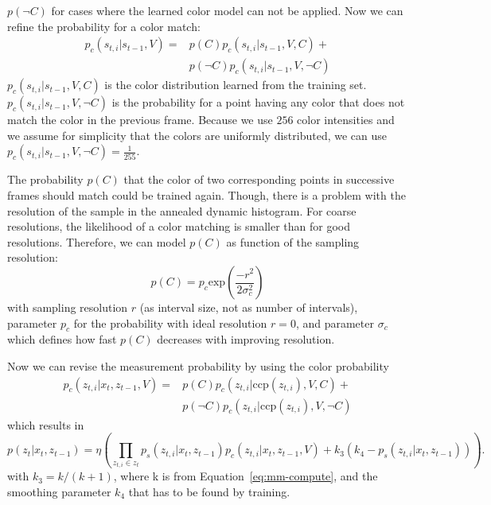 \documentclass[twoside,a4paper,article]{combine}
\begin{document}
$p(\neg C)$ for cases where the learned color model can not be
applied. Now we can refine the probability for a color match:
\begin{align}
p_c(s_{t,i}|s_{t-1},V)
  = &p(C)p_c(s_{t,i}|s_{t-1},V,C)+ \nonumber\\
&p(\neg C)p_c(s_{t,i}|s_{t-1},V,\neg C)\nonumber
\end{align}
$p_c(s_{t,i}|s_{t-1},V,C)$ is the color distribution learned from the
training set. $p_c(s_{t,i}|s_{t-1},V,\neg C)$ is the probability for a
point having any color that does not match the color in the previous
frame. Because we use $256$ color intensities and we assume for
simplicity that the colors are uniformly distributed, we can use
$p_c(s_{t,i}|s_{t-1},V,\neg C) = \frac{1}{255}$.

The probability $p(C)$ that the color of two corresponding points in
successive frames should match could be trained again. Though, there is
a problem with the resolution of the sample in the annealed dynamic
histogram. For coarse resolutions, the likelihood of a color
matching is smaller than for good resolutions. Therefore, we can model
$p(C)$ as function of the sampling resolution:
\begin{equation}
  p(C) = p_c \mathrm{exp}\left( \frac{-r^2}{2\sigma_c^2} \right)
\end{equation}
with sampling resolution $r$ (as interval size, not as number of
intervals), parameter $p_c$ for the probability with ideal resolution
$r=0$, and parameter $\sigma_c$ which defines how fast $p(C)$ decreases
with improving resolution.

Now we can revise the measurement probability by
using the color probability
\begin{align}
  p_c(z_{t,i}|x_t,z_{t-1},V) 
  = &p(C)p_c(z_{t,i}|\mathrm{ccp}(z_{t,i}),V,C)+\nonumber\\
  &p(\neg C)p_c(z_{t,i}|\mathrm{ccp}(z_{t,i}),V,\neg C)
\end{align}
which results in
\begin{equation}
\label{eq:mm-color-compute}
p(z_t|x_t,z_{t-1}) = \eta\left(\prod_{z_{t,i}\in z_t}
p_s(z_{t,i}|x_t,z_{t-1})p_c(z_{t,i}|x_t,z_{t-1},V)
+ k_3(k_4 - p_s(z_{t,i}|x_t,z_{t-1}))
\right)
\mathrm{ . }
\end{equation}
with $k_3=k/(k+1)$, where k is from Equation~\ref{eq:mm-compute}, and
the smoothing parameter $k_4$ that has to be found by training.
\end{document}
